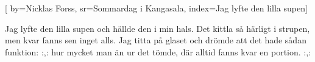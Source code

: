 [
	by={Nicklas Forss},
	sr={Sommardag i Kangasala},
	index={Jag lyfte den lilla supen}]
	
\beginverse*						
Jag lyfte den lilla supen
och hällde den i min hals.
Det kittla så härligt i strupen,
men kvar fanns sen inget alls.
Jag titta på glaset och drömde
att det hade sådan funktion:
:,: hur mycket man än ur det tömde,
där alltid fanns kvar en portion. :,:
\endverse						
\endsong		
